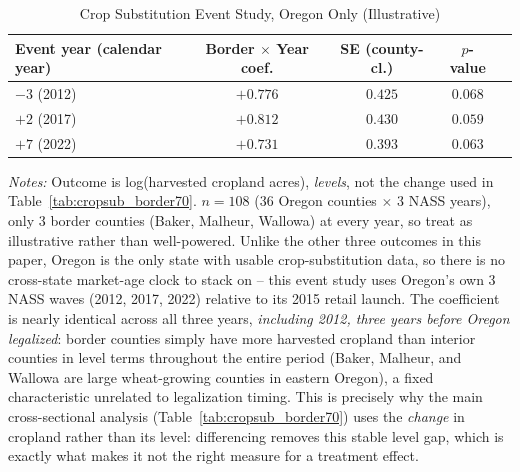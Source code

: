 \begin{table}[htbp]
\centering
\caption{Crop Substitution Event Study, Oregon Only (Illustrative)}
\label{tab:cropsub_eventstudy}
\begin{tabular}{lcccc}
\toprule
Event year (calendar year) & Border $\times$ Year coef. & SE (county-cl.) & $p$-value \\
\midrule
$-3$ (2012) & $+0.776$ & $0.425$ & $0.068$ \\
$+2$ (2017) & $+0.812$ & $0.430$ & $0.059$ \\
$+7$ (2022) & $+0.731$ & $0.393$ & $0.063$ \\
\bottomrule
\end{tabular}
\begin{minipage}{0.95\textwidth}
\vspace{0.3em}
\footnotesize
\textit{Notes:} Outcome is log(harvested cropland acres), \emph{levels}, not the change used in
Table~\ref{tab:cropsub_border70}. $n=108$ (36 Oregon counties $\times$ 3 NASS years), only 3 border
counties (Baker, Malheur, Wallowa) at every year, so treat as illustrative rather than well-powered.
Unlike the other three outcomes in this paper, Oregon is the only state with usable crop-substitution
data, so there is no cross-state market-age clock to stack on -- this event study uses Oregon's own 3
NASS waves (2012, 2017, 2022) relative to its 2015 retail launch. The coefficient is nearly identical
across all three years, \emph{including 2012, three years before Oregon legalized}: border counties simply
have more harvested cropland than interior counties in level terms throughout the entire period (Baker,
Malheur, and Wallowa are large wheat-growing counties in eastern Oregon), a fixed characteristic unrelated
to legalization timing. This is precisely why the main cross-sectional analysis
(Table~\ref{tab:cropsub_border70}) uses the \emph{change} in cropland rather than its level: differencing
removes this stable level gap, which is exactly what makes it not the right measure for a treatment effect.
\end{minipage}
\end{table}
